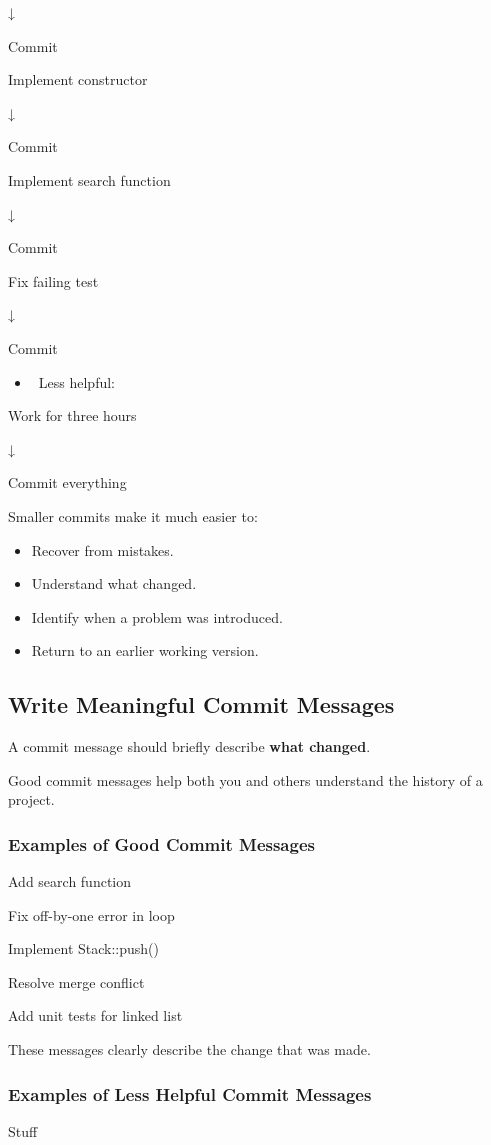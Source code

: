 \documentclass{csc2059practical}
\begin{document}
↓

Commit

Implement constructor

↓

Commit

Implement search function

↓

Commit

Fix failing test

↓

Commit

\begin{itemize}
  \item \faTimes\ Less helpful:
\end{itemize}
Work for three hours

↓

Commit everything

Smaller commits make it much easier to:

\begin{itemize}
  \item Recover from mistakes.
  \item Understand what changed.
  \item Identify when a problem was introduced.
  \item Return to an earlier working version.
\end{itemize}
\subsection{Write Meaningful Commit Messages}
A commit message should briefly describe \textbf{what changed}.

Good commit messages help both you and others understand the history of a project.

\subsubsection{Examples of Good Commit Messages}
Add search function

Fix off-by-one error in loop

Implement Stack::push()

Resolve merge conflict

Add unit tests for linked list

These messages clearly describe the change that was made.

\subsubsection{Examples of Less Helpful Commit Messages}
Stuff
\end{document}
